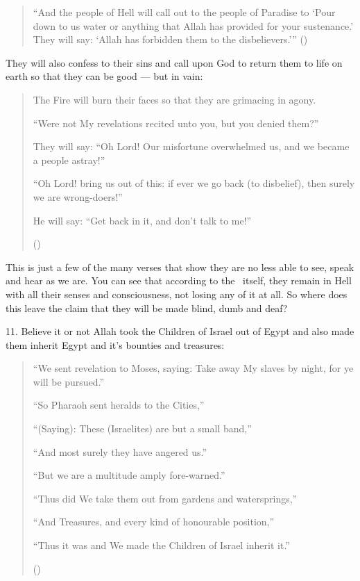 \documentclass[12pt]{memoir}
\begin{document}
\begin{quote}
“And the people of Hell will call out to the people of Paradise to
‘Pour down to us water or anything
that Allah has provided for your sustenance.’
They will say: ‘Allah has forbidden them to the disbelievers.’”
()
\end{quote}

They will also confess to their sins and call upon God to return them
to life on earth so that they can be good — but in vain:

\begin{quote}
The Fire will burn their faces so that they are grimacing in agony.

“Were not My revelations recited unto you, but you denied them?”

They will say:
“Oh Lord! Our misfortune overwhelmed us, and we became a people astray!”

“Oh Lord! bring us out of this: if ever we go back (to disbelief),
then surely we are wrong-doers!”

He will say: “Get back in it, and don’t talk to me!”

()
\end{quote}

This is just a few of the many verses that show they are
no less able to see, speak and hear as we are.
You can see that according to the \Quran\ itself,
they remain in Hell with all their senses and consciousness,
not losing any of it at all.
So where does this leave the claim
that they will be made blind, dumb and deaf?

\renewcommand{\thefootnote}{*}


11. Believe it or not Allah took the Children of Israel out of Egypt
and also made them inherit Egypt and it’s bounties and treasures:

\begin{quote}
“We sent revelation to Moses, saying:
Take away My slaves by night, for ye will be pursued.”

“So Pharaoh sent heralds to the Cities,”

“(Saying): These (Israelites) are but a small band,”

“And most surely they have angered us.”

“But we are a multitude amply fore-warned.”

“Thus did We take them out from gardens and watersprings,”

“And Treasures, and every kind of honourable position,”

“Thus it was and We made the Children of Israel inherit it.”

()
\end{quote}
\end{document}
